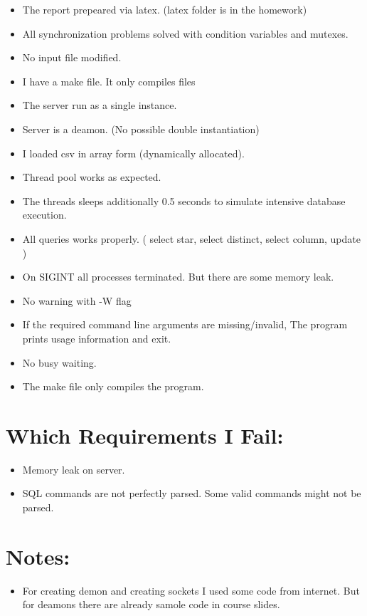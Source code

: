 \documentclass[10pt,english, openany]{book}
\begin{document}
\begin{itemize}
  \item The report prepeared via latex. (latex folder is in the homework)
  \item All synchronization problems solved with condition variables and mutexes.
  \item No input file modified.
  \item I have a make file. It only compiles files
  \item The server run as a single instance.
  \item Server is a deamon. (No possible double instantiation)
  \item I loaded csv in array form (dynamically allocated).
  \item Thread pool works as expected.
  \item The threads  sleeps additionally 0.5 seconds to simulate intensive database execution.
  \item All queries works properly. ( select star, select distinct, select column, update  )
  \item On SIGINT all processes terminated. But there are some memory leak.
  \item No warning with -W flag
  \item If the required command line arguments are missing/invalid, The program prints usage information and exit.
  \item No busy waiting.
  \item The make file only compiles the program.
\end{itemize}


\section{Which Requirements I Fail:}

\begin{itemize}
  \item Memory leak on server.
  \item SQL commands are not perfectly parsed. Some valid commands might not be parsed.
\end{itemize}

\section{Notes:}

\begin{itemize}
  \item For creating demon and creating sockets I used some code from internet. But for deamons there are already samole code in course slides.

\end{itemize}
\end{document}
